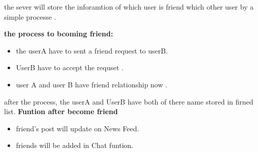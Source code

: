 the sever will store the inforamtion of which user is friend which other user by
a simple processe .

\textbf{the process to bcoming friend:}
\begin{itemize}
\item the userA have to sent a friend request to userB.
\item UserB have to accept the requset .
\item user A and user B have friend relationship now .
\end{itemize}


after the process, the userA and UserB have both of there name stored in firned
list.
\textbf{Funtion after become friend}
\begin{itemize}
\item friend's post will update on News Feed.
\item friends will be added in Chat funtion.
\end{itemize}
